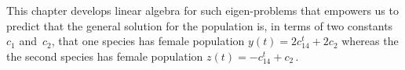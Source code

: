 This chapter develops linear algebra for such eigen-problems that empowers us to predict that the general solution for the population is, in terms of two constants~\(c_1\) and~\(c_2\), that one species has female population \(y(t)=2c_14^t+2c_2\) whereas the the second species has female population \(z(t)=-c_14^t+c_2\)\,.

%




